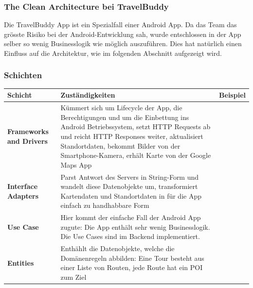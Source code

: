 \documentclass[a4paper,10pt,xetex]{article}
\begin{document}
\subsubsection{The Clean Architecture bei TravelBuddy}
Die TravelBuddy App ist ein Spezialfall einer Android App. Da das Team das grösste 
Risiko bei der Android-Entwicklung sah, wurde entschlossen in der App selber so 
wenig Businesslogik wie möglich auszuführen. 
Dies hat natürlich einen Einfluss auf die Architektur, wie im folgenden Abschnitt aufgezeigt wird.


\subsubsection{Schichten}\label{layerstravelbuddy}
\begin{longtabu} to \textwidth { | l | X[l] |  }
\hline
\textbf{Schicht} & \textbf{Zuständigkeiten} & \textbf{Beispiel} \\\hline
\endhead
\textbf{Frameworks and Drivers} & Kümmert sich um Lifecycle der App, die Berechtigungen 
und um die Einbettung ins Android Betriebssystem, setzt HTTP Requests ab und reicht 
HTTP Responses weiter, aktualisiert Standortdaten, bekommt Bilder von der 
Smartphone-Kamera, erhält Karte von der Google Maps App\\\hline
\textbf{Interface Adapters} & Parst Antwort des Servers in String-Form und wandelt 
diese Datenobjekte um, transformiert Kartendaten und Standortdaten in für die App 
einfach zu handhabbare Form\\\hline
\textbf{Use Case} & Hier kommt der einfache Fall der Android App zugute: Die App 
enthält sehr wenig Businesslogik. Die Use Cases sind im Backend implementiert.\\\hline
\textbf{Entities} & Enthählt die Datenobjekte, welche die Domänenregeln abbilden: 
Eine Tour besteht aus einer Liste von Routen, jede Route hat ein POI zum Ziel\\\hline
\end{longtabu}
\end{document}
